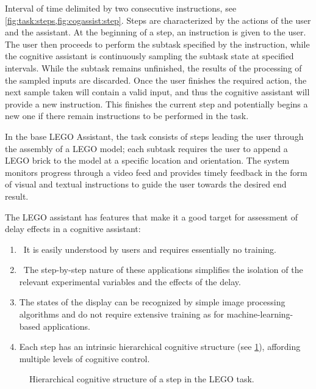 \documentclass[10pt,letterpaper]{article}
\begin{document}
\begin{definition}[Step]
  Interval of time delimited by two consecutive instructions, see \cref{fig:task:steps,fig:cogassist:step}.
  Steps are characterized by the actions of the user and the assistant.
  At the beginning of a step, an instruction is given to the user.
  The user then proceeds to perform the subtask specified by the instruction, while the cognitive assistant is continuously sampling the subtask state at specified intervals. 
  While the subtask remains unfinished, the results of the processing of the sampled inputs are discarded.
  Once the user finishes the required action, the next sample taken will contain a valid input, and thus the cognitive assistant will provide a new instruction. 
  This finishes the current step and potentially begins a new one if there remain instructions to be performed in the task.
\end{definition}

In the base LEGO Assistant, the task consists of steps leading the user through the assembly of a LEGO model; each subtask requires the user to append a LEGO brick to the model at a specific location and orientation.
The system monitors progress through a video feed and provides timely feedback in the form of visual and textual instructions to guide the user towards the desired end result. 

The LEGO assistant has features that make it a good target for assessment of delay effects in a cognitive assistant:
\begin{enumerate}
    \item \ It is easily understood by users and requires essentially no training. 
    \item\ The step-by-step nature of these applications simplifies the isolation of the relevant experimental variables and the effects of the delay.
    \item The states of the display can be recognized by simple image processing algorithms and do not require extensive training as for machine-learning-based applications.
    \item Each step has an intrinsic hierarchical cognitive structure (see \cref{fig:lego:hierarchical}), affording multiple levels of cognitive control. 
\end{enumerate}

\begin{figure}[h]
  \centering
  
  \caption{Hierarchical cognitive structure of a step in the LEGO task.}
  \label{fig:lego:hierarchical}
\end{figure}
\end{document}
